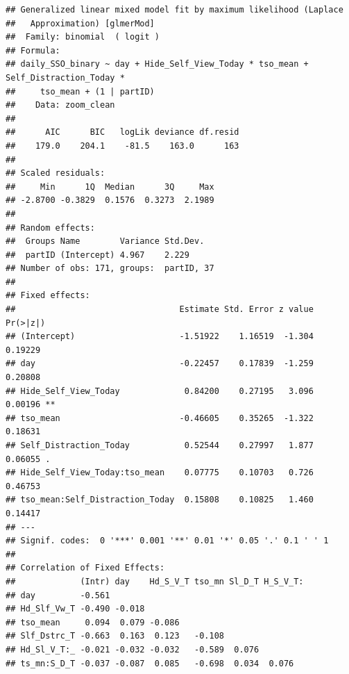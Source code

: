 \documentclass[
  english,
  man]{apa7}
\begin{document}
\begin{verbatim}
## Generalized linear mixed model fit by maximum likelihood (Laplace
##   Approximation) [glmerMod]
##  Family: binomial  ( logit )
## Formula: 
## daily_SSO_binary ~ day + Hide_Self_View_Today * tso_mean + Self_Distraction_Today *  
##     tso_mean + (1 | partID)
##    Data: zoom_clean
## 
##      AIC      BIC   logLik deviance df.resid 
##    179.0    204.1    -81.5    163.0      163 
## 
## Scaled residuals: 
##     Min      1Q  Median      3Q     Max 
## -2.8700 -0.3829  0.1576  0.3273  2.1989 
## 
## Random effects:
##  Groups Name        Variance Std.Dev.
##  partID (Intercept) 4.967    2.229   
## Number of obs: 171, groups:  partID, 37
## 
## Fixed effects:
##                                 Estimate Std. Error z value Pr(>|z|)   
## (Intercept)                     -1.51922    1.16519  -1.304  0.19229   
## day                             -0.22457    0.17839  -1.259  0.20808   
## Hide_Self_View_Today             0.84200    0.27195   3.096  0.00196 **
## tso_mean                        -0.46605    0.35265  -1.322  0.18631   
## Self_Distraction_Today           0.52544    0.27997   1.877  0.06055 . 
## Hide_Self_View_Today:tso_mean    0.07775    0.10703   0.726  0.46753   
## tso_mean:Self_Distraction_Today  0.15808    0.10825   1.460  0.14417   
## ---
## Signif. codes:  0 '***' 0.001 '**' 0.01 '*' 0.05 '.' 0.1 ' ' 1
## 
## Correlation of Fixed Effects:
##             (Intr) day    Hd_S_V_T tso_mn Sl_D_T H_S_V_T:
## day         -0.561                                       
## Hd_Slf_Vw_T -0.490 -0.018                                
## tso_mean     0.094  0.079 -0.086                         
## Slf_Dstrc_T -0.663  0.163  0.123   -0.108                
## Hd_Sl_V_T:_ -0.021 -0.032 -0.032   -0.589  0.076         
## ts_mn:S_D_T -0.037 -0.087  0.085   -0.698  0.034  0.076
\end{verbatim}
\end{document}
